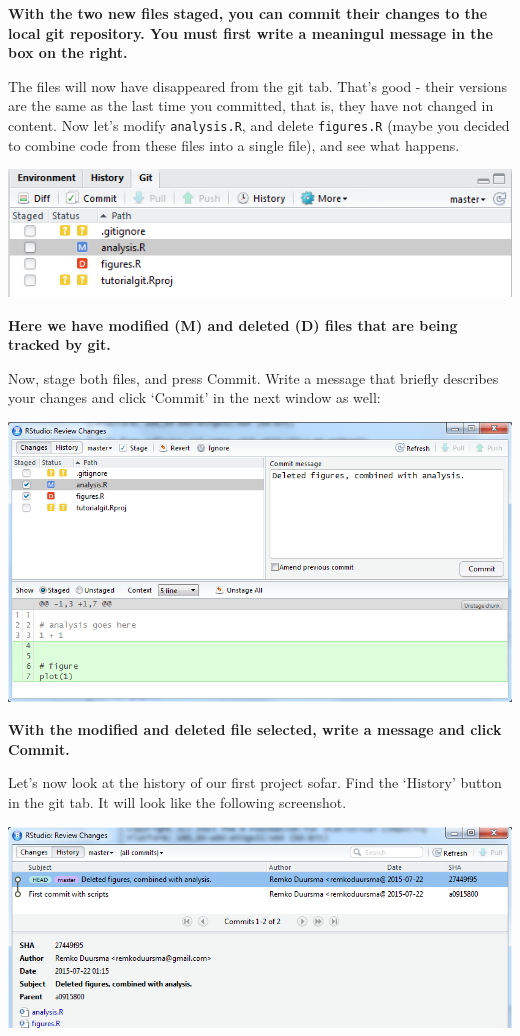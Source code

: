 \documentclass[]{book}
\begin{document}
\textbf{With the two new files staged, you can commit their changes to the local git repository. You must first write a meaningul message in the box on the right.}

The files will now have disappeared from the git tab. That's good - their versions are the same as the last time you committed, that is, they have not changed in content. Now let's modify \texttt{analysis.R}, and delete \texttt{figures.R} (maybe you decided to combine code from these files into a single file), and see what happens.

\includegraphics[width=0.75\linewidth]{screenshots/gitsecondcommit}

\textbf{Here we have modified (M) and deleted (D) files that are being tracked by git.}

Now, stage both files, and press Commit. Write a message that briefly describes your changes and click `Commit' in the next window as well:

\includegraphics[width=0.75\linewidth]{screenshots/secondcommit}

\textbf{With the modified and deleted file selected, write a message and click Commit.}

Let's now look at the history of our first project sofar. Find the `History' button in the git tab. It will look like the following screenshot.

\includegraphics[width=0.75\linewidth]{screenshots/firsthistory}
\end{document}
